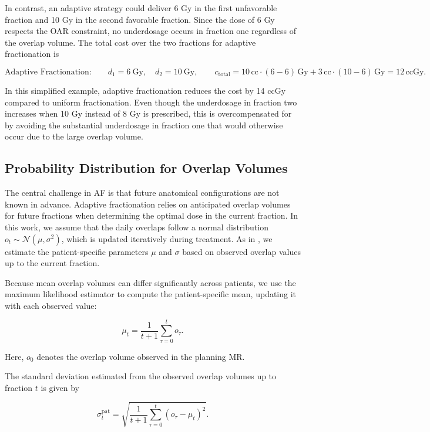 \documentclass[11pt]{article}
\begin{document}
In contrast, an adaptive strategy could deliver 6 Gy in the first unfavorable fraction and 10 Gy in the second favorable fraction. Since the dose of 6 Gy respects the OAR constraint, no underdosage occurs in fraction one regardless of the overlap volume. The total cost over the two fractions for adaptive fractionation is

\[
\text{Adaptive Fractionation:}\qquad d_1 = 6~\mathrm{Gy},\quad d_2 = 10~\mathrm{Gy}, \qquad
c_{\mathrm{total}} = 10\,\mathrm{cc}\cdot(6-6)\,\mathrm{Gy} + 3\,\mathrm{cc}\cdot(10-6)\,\mathrm{Gy} = 12\,\mathrm{ccGy}.
\]

In this simplified example, adaptive fractionation reduces the cost by 14 ccGy compared to uniform fractionation. Even though the underdosage in fraction two increases when 10 Gy instead of 8 Gy is prescribed, this is overcompensated for by avoiding the substantial underdosage in fraction one that would otherwise occur due to the large overlap volume.

\subsection{Probability Distribution for Overlap Volumes}

The central challenge in AF is that future anatomical configurations are not known in advance. Adaptive fractionation relies on anticipated overlap volumes for future fractions when determining the optimal dose in the current fraction. In this work, we assume that the daily overlaps follow a normal distribution $o_t \sim \mathcal{N}(\mu,\sigma^2)$, which is updated iteratively during treatment. As in \cite{ref13}, we estimate the patient-specific parameters $\mu$ and $\sigma$ based on observed overlap values up to the current fraction.

Because mean overlap volumes can differ significantly across patients, we use the maximum likelihood estimator to compute the patient-specific mean, updating it with each observed value:

\begin{equation}
\mu_t = \frac{1}{t+1}\sum_{\tau=0}^{t} o_{\tau}.
\label{eq:mu-overlap}
\end{equation}

Here, $o_0$ denotes the overlap volume observed in the planning MR.

The standard deviation estimated from the observed overlap volumes up to fraction $t$ is given by

\begin{equation}
\sigma_t^{\mathrm{pat}} = \sqrt{\frac{1}{t+1}\sum_{\tau=0}^{t}(o_{\tau} - \mu_t)^2}.
\label{eq:sigma-pat-overlap}
\end{equation}
\end{document}
